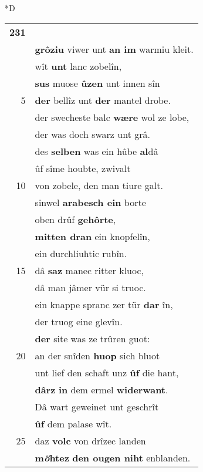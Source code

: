 \documentclass[8pt,a4paper,notitlepage]{article}
\begin{document}
\begin{table}[ht]
\begin{minipage}[t]{0.5\linewidth}
\small
\begin{center}*D
\end{center}
\begin{tabular}{rl}
\textbf{231} & \textbf{\textit{\begin{large}D\end{large}}er wirt} het durch siecheit\\ 
 & \textbf{grôziu} viwer unt \textbf{an im} warmiu kleit.\\ 
 & wît \textbf{unt} lanc zobelîn,\\ 
 & \textbf{sus} muose \textbf{ûzen} unt innen sîn\\ 
5 & \textbf{der} bellîz unt \textbf{der} mantel drobe.\\ 
 & der swecheste balc \textbf{wære} wol ze lobe,\\ 
 & der was doch swarz unt grâ.\\ 
 & des \textbf{selben} was ein hûbe \textbf{al}dâ\\ 
 & ûf sîme houbte, zwivalt\\ 
10 & von zobele, den man tiure galt.\\ 
 & sinwel \textbf{arabesch ein} borte\\ 
 & oben drûf \textbf{gehôrte},\\ 
 & \textbf{mitten dran} ein knopfelîn,\\ 
 & ein durchliuhtic rubîn.\\ 
15 & dâ \textbf{saz} manec ritter kluoc,\\ 
 & dâ man jâmer vür si truoc.\\ 
 & ein knappe spranc zer tür \textbf{dar} în,\\ 
 & der truog eine glevîn.\\ 
 & \textbf{der} site was ze trûren guot:\\ 
20 & an der snîden \textbf{huop} sich bluot\\ 
 & unt lief den schaft unz \textbf{ûf} die hant,\\ 
 & \textbf{dârz} \textbf{in} dem ermel \textbf{widerwant}.\\ 
 & Dâ wart geweinet unt geschrît\\ 
 & \textbf{ûf} dem palase wît.\\ 
25 & daz \textbf{volc} von drîzec landen\\ 
 & \textbf{m\textit{ö}htez} \textbf{den ougen niht} enblanden.\\ 

\end{tabular}
\end{minipage}
\end{table}
\end{document}

